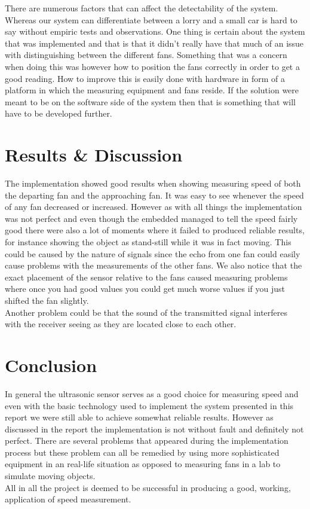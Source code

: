 \documentclass[a4paper,11pt]{article}
\begin{document}
There are numerous factors that can affect the detectability of the system. Whereas our system can differentiate between a lorry and a small car is hard to say without empiric tests and observations. One thing is certain about the system that was implemented and that is that it didn't really have that much of an issue with distinguishing between the different fans. Something that was a concern when doing this was however how to position the fans correctly in order to get a good reading. How to improve this is easily done with hardware in form of a platform in which the measuring equipment and fans reside. If the solution were meant to be on the software side of the system then that is something that will have to be developed further.


\section{Results \& Discussion}
The implementation showed good results when showing measuring speed of both the departing fan and the approaching fan. It was easy to see whenever the speed of any fan decreased or increased. However as with all things the implementation was not perfect and even though the embedded managed to tell the speed fairly good there were also a lot of moments where it failed to produced reliable results, for instance showing the object as stand-still while it was in fact moving. This could be caused by the nature of signals since the echo from one fan could easily cause problems with the measurements of the other fans. We also notice that the exact placement of the sensor relative to the fans caused measuring problems where once you had good values you could get much worse values if you just shifted the fan slightly. \\
Another problem could be that the sound of the transmitted signal interferes with the receiver seeing as they are located close to each other.

\section{Conclusion}
In general the ultrasonic sensor serves as a good choice for measuring speed and even with the basic technology used to implement the system presented in this report we were still able to achieve somewhat reliable results. However as discussed in the report the implementation is not without fault and definitely not perfect. There are several problems that appeared during the implementation process but these problem can all be remedied by using more sophisticated equipment in an real-life situation as opposed to measuring fans in a lab to simulate moving objects. \\
All in all the project is deemed to be successful in producing a good, working, application of speed measurement.
\end{document}
